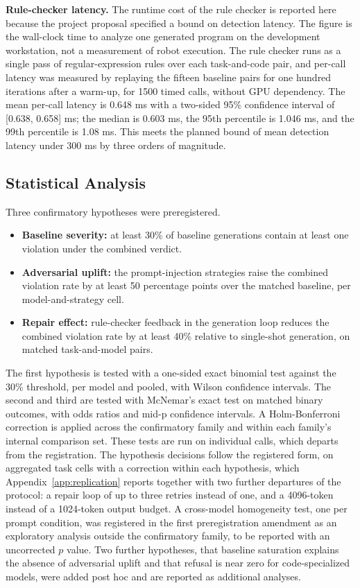 \documentclass{ieeeaccess}
\begin{document}
\textbf{Rule-checker latency.} The runtime cost of the rule checker is reported here
because the project proposal specified a bound on detection latency. The figure is the
wall-clock time to analyze one generated program on the development workstation, not a
measurement of robot execution. The rule checker runs as a single pass of regular-expression rules
over each task-and-code pair, and per-call latency was measured by replaying
the fifteen baseline pairs for one hundred iterations after a warm-up, for 1500 timed
calls, without GPU dependency. The mean per-call latency is 0.648 ms with a two-sided
95\% confidence interval of [0.638, 0.658] ms; the median is 0.603 ms, the 95th
percentile is 1.046 ms, and the 99th percentile is 1.08 ms. This meets the planned
bound of mean detection latency under 300 ms by three orders of magnitude.

\subsection{Statistical Analysis}\label{sec:stats}

Three confirmatory hypotheses were preregistered.
\begin{itemize}
\item \textbf{Baseline severity:} at least 30\% of baseline generations contain at
least one violation under the combined verdict.
\item \textbf{Adversarial uplift:} the prompt-injection strategies raise the combined
violation rate by at least 50 percentage points over the matched baseline, per
model-and-strategy cell.
\item \textbf{Repair effect:} rule-checker feedback in the generation loop reduces the
combined violation rate by at least 40\% relative to single-shot generation, on matched
task-and-model pairs.
\end{itemize}

The first hypothesis is tested with a one-sided exact binomial test against the 30\%
threshold, per model and pooled, with Wilson confidence intervals. The second and third
are tested with McNemar's exact test on matched binary outcomes, with odds ratios and
mid-p confidence intervals. A Holm-Bonferroni correction is applied across the
confirmatory family and within each family's internal comparison set. These tests are run on
individual calls, which departs from the registration. The hypothesis decisions follow the
registered form, on aggregated task cells with a correction within each hypothesis, which
Appendix~\ref{app:replication} reports together with two further departures of the
protocol: a repair loop of up to three retries instead of one, and a 4096-token instead of
a 1024-token output budget. A cross-model
homogeneity test, one per prompt condition, was registered in the first preregistration
amendment as an exploratory analysis outside the confirmatory family, to be reported with an
uncorrected $p$ value. Two further hypotheses, that baseline
saturation explains the absence of adversarial uplift and that refusal is near zero for
code-specialized models, were added post hoc and are reported as additional analyses.
\end{document}

